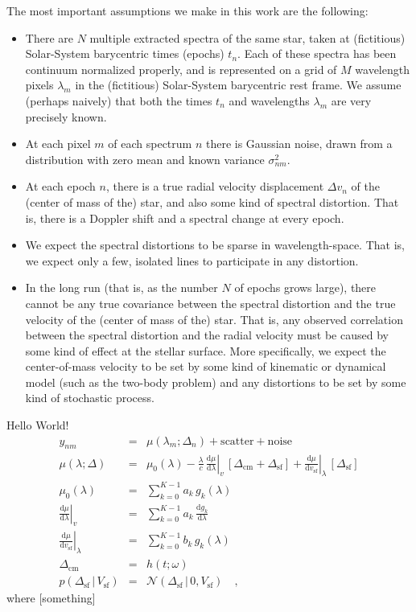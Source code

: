 \documentclass[12pt, letterpaper]{article}
\newcommand{\dd}{\mathrm{d}}
\newcommand{\given}{\,|\,}
\newcommand{\normal}{{\mathcal{N}}}
\newcommand{\com}{\mathrm{cm}}
\newcommand{\surf}{\mathrm{sf}}
\begin{document}
The most important assumptions we make in this work are the following:
\begin{itemize}\itemsep=0ex
\item There are $N$ multiple extracted spectra of the same star, taken
  at (fictitious) Solar-System barycentric times (epochs) $t_n$. Each
  of these spectra has been continuum normalized properly, and is
  represented on a grid of $M$ wavelength pixels $\lambda_m$ in the
  (fictitious) Solar-System barycentric rest frame. We assume (perhaps
  naively) that both the times $t_n$ and wavelengths $\lambda_m$ are
  very precisely known.
\item At each pixel $m$ of each spectrum $n$ there is Gaussian noise,
  drawn from a distribution with zero mean and known variance
  $\sigma^2_{nm}$.
\item At each epoch $n$, there is a true radial velocity displacement
  $\Delta v_n$ of the (center of mass of the) star, and also some kind
  of spectral distortion.  That is, there is a Doppler shift and a
  spectral change at every epoch.
\item We expect the spectral distortions to be sparse in
  wavelength-space.  That is, we expect only a few, isolated lines to
  participate in any distortion.
\item In the long run (that is, as the number $N$ of epochs grows
  large), there cannot be any true covariance between the spectral
  distortion and the true velocity of the (center of mass of the)
  star. That is, any observed correlation between the spectral
  distortion and the radial velocity must be caused by some kind of
  effect at the stellar surface. More specifically, we expect the
  center-of-mass velocity to be set by some kind of kinematic or
  dynamical model (such as the two-body problem) and any
  distortions to be set by some kind of stochastic process.
\end{itemize}

Hello World!
\begin{eqnarray}
  y_{nm} &=& \mu(\lambda_m; \Delta_n) + \mathrm{scatter} + \mathrm{noise}
  \\
  \mu(\lambda; \Delta) &=& \mu_0(\lambda)
  - \frac{\lambda}{c}\,\left.\frac{\dd \mu}{\dd\lambda}\right|_{v}\,[\Delta_\com + \Delta_\surf]
  + \left.\frac{\dd \mu}{\dd v_\surf}\right|_{\lambda}\,[\Delta_\surf]
  \\
  \mu_0(\lambda) &=& \sum_{k=0}^{K-1} a_k\,g_k(\lambda)
  \\
  \left.\frac{\dd \mu}{\dd\lambda}\right|_{v} &=& \sum_{k=0}^{K-1} a_k\,\frac{\dd g_k}{\dd\lambda}
  \\
  \left.\frac{\dd \mu}{\dd v_\surf}\right|_{\lambda} &=& \sum_{k=0}^{K-1} b_k\,g_k(\lambda)
  \\
  \Delta_\com &=& h(t; \omega)
  \\
  p(\Delta_\surf \given V_\surf) &=& \normal(\Delta_\surf \given 0, V_\surf)
  \quad ,
\end{eqnarray}
where [something]
\end{document}
